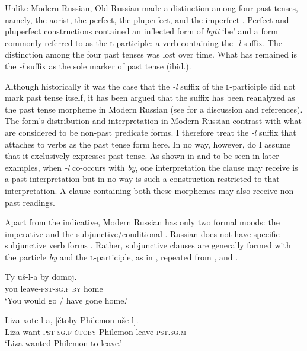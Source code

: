 \documentclass[output=paper,
modfonts,
newtxmath,
hidelinks,
]{langscibook}
\begin{document}
\noindent Unlike Modern Russian, Old Russian made a distinction among four past tenses, namely, the aorist, the perfect, the pluperfect, and the imperfect \citep[38]{Mezhevich2006}. Perfect and pluperfect constructions contained an inflected form of \textit{byti} ‘be’ and a form commonly referred to as the \textsc{l}-participle: a verb containing the \textit{-l} suffix. The distinction among the four past tenses was lost over time. What has remained is the \textit{-l} suffix as the sole marker of past tense (ibid.).

Although historically it was the case that the \textit{-l} suffix of the \textsc{l}-participle did not mark past tense itself, it has been argued that the suffix has been reanalyzed as the past tense morpheme in Modern Russian (see \citealt{Mezhevich2006} for a discussion and references). The form’s distribution and interpretation in Modern Russian contrast with what are considered to be non-past predicate forms. I therefore treat the \textit{-l} suffix that attaches to verbs as the past tense form here. In no way, however, do I assume that it exclusively expresses past tense. As shown in  and to be seen in later examples, when \textit{{}-}\textit{l\-} co-occurs with \textit{by}, one interpretation the clause may receive is a past interpretation but in no way is such a construction restricted to that interpretation. A clause containing both these morphemes may also receive non-past readings.

Apart from the indicative, Modern Russian has only two formal moods: the imperative and the subjunctive/conditional \citep[157]{Cubberley2002}. Russian does not have specific subjunctive verb forms \citep[118]{Mezhevich2006}. Rather, subjunctive clauses are generally formed with the particle \textit{by} and the \textsc{l}-participle, as in , repeated from , and .

\ea \label{ex5}
\gll Ty uš-l-a by domoj.\\
     you leave\textsc{-pst-sg.f} \textsc{by} home\\
\glt `You would go / have gone home.' \hfill \citep[152]{Mezhevich2006}
\z

\ea \label{ex6}
\gll Liza xote-l-a, [čtoby Philemon uše-l].\\
     Liza want\textsc{-pst-sg.f} { }\textsc{čtoby} Philemon leave-\textsc{pst.sg.m}\\
\glt `Liza wanted Philemon to leave.' \hfill \citep[148]{Mezhevich2006}
\z
\end{document}
